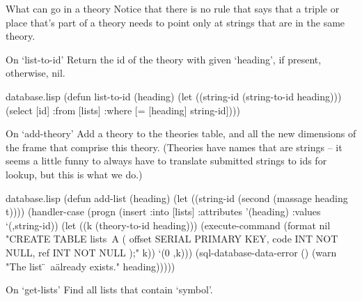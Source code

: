 \begin{notate}{What can go in a theory} \label{what-can-go-in}
Notice that there is no rule that says that a triple or
place that's part of a theory needs to point only at
strings that are in the same theory.
\end{notate}

\begin{notate}{On `list-to-id'}
Return the id of the theory with given `heading', if present,
otherwise, nil.
\end{notate}

\begin{common}{database.lisp}
(defun list-to-id (heading)
  (let ((string-id (string-to-id heading)))
    (select [id]
            :from [lists]
            :where [= [heading] string-id])))
\end{common}

\begin{notate}{On `add-theory'} \label{add-theory}
Add a theory to the theories table, and all the new
dimensions of the frame that comprise this theory.
(Theories have names that are strings -- it seems a
little funny to always have to translate submitted
strings to ids for lookup, but this is what we do.)
\end{notate}

\begin{common}{database.lisp}
(defun add-list (heading)
  (let ((string-id (second (massage heading t))))
    (handler-case
        (progn (insert :into [lists]
                       :attributes '(heading)
                       :values `(,string-id))
               (let ((k (theory-to-id heading)))
                 (execute-command
                  (format nil "CREATE TABLE lists~A (
   offset SERIAL PRIMARY KEY,
   code INT NOT NULL,
   ref INT NOT NULL
);" k))
                 `(0 ,k)))
      (sql-database-data-error
          ()
        (warn "The list \"~a\" already exists."
              heading)))))
\end{common}

\begin{notate}{On `get-lists'}
Find all lists that contain `symbol'.
\end{notate}

